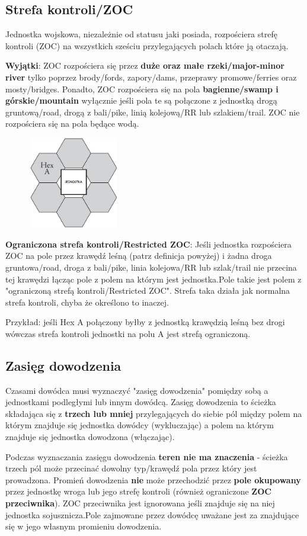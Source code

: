 \documentclass[10pt,twoside,a4paper,table]{article}
\begin{document}
\begin{multicols*}{2}
	\subsection{Strefa kontroli/ZOC}
	Jednostka wojskowa, niezależnie od statusu jaki posiada, rozpościera strefę kontroli (ZOC) na wszystkich sześciu przylegających polach które ją otaczają.\par
	\textbf{Wyjątki}: ZOC rozpościera się przez \textbf{duże oraz małe rzeki/major-minor river} tylko poprzez brody/fords, zapory/dams, przeprawy promowe/ferries oraz mosty/bridges. Ponadto, ZOC rozpościera się na pola \textbf{bagienne/swamp i górskie/mountain} wyłącznie jeśli pola te są połączone z jednostką drogą gruntową/road, drogą z bali/pike, linią kolejową/RR lub szlakiem/trail. ZOC nie rozpościera się na pola będące wodą.
	\begin{figure}
		\includegraphics[width=4cm, height=4cm]{zoc.png} 
	\end{figure}\par
	\textbf{Ograniczona strefa kontroli/Restricted ZOC}: Jeśli jednostka rozpościera ZOC na pole przez krawędź leśną (patrz definicja powyżej) i żadna droga gruntowa/road, droga z bali/pike, linia kolejowa/RR lub szlak/trail nie przecina tej krawędzi łącząc pole z polem na którym jest jednostka.Pole takie jest polem z "ograniczoną strefą kontroli/Restricted ZOC". Strefa taka działa jak normalna strefa kontroli, chyba że określono to inaczej.\par
	Przykład: jeśli Hex A połączony byłby z jednostką krawędzią leśną bez drogi wówczas strefa kontroli jednostki na polu A jest strefą ograniczoną.
	\subsection{Zasięg dowodzenia}
	Czasami dowódca musi wyznaczyć "zasięg dowodzenia" pomiędzy sobą a jednostkami podległymi lub innym dowódcą. Zasięg dowodzenia to ścieżka składająca się z \textbf{trzech lub mniej} przylegających do siebie pól między polem na którym znajduje się jednostka dowódcy (wykluczając) a polem na którym znajduje się jednostka dowodzona (włączając).\par
	Podczas wyznaczania zasięgu dowodzenia \textbf{teren nie ma znaczenia} - ścieżka trzech pól może przecinać dowolny typ/krawędź pola przez który jest prowadzona. Promień dowodzenia \textbf{nie} może przechodzić przez \textbf{pole okupowany} przez jednostkę wroga lub jego strefę kontroli (również ograniczone \textbf{ZOC przeciwnika}). ZOC przeciwnika jest ignorowana jeśli znajduje się na niej jednostka sojusznicza.Pole zajmowane przez dowódcę uważane jest za znajdujące się w jego własnym promieniu dowodzenia.

\end{multicols*}
\end{document}
